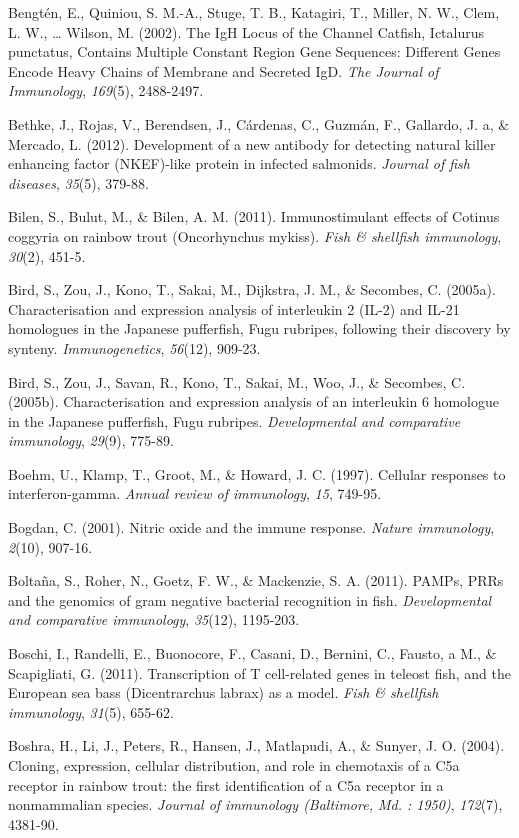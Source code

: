 \documentclass[12pt,letterpaper,oneside]{scrbook}
\begin{document}
Bengtén, E., Quiniou, S. M.-A., Stuge, T. B., Katagiri, T., Miller, N.
W., Clem, L. W., \ldots{} Wilson, M. (2002). The IgH Locus of the
Channel Catfish, Ictalurus punctatus, Contains Multiple Constant Region
Gene Sequences: Different Genes Encode Heavy Chains of Membrane and
Secreted IgD. \emph{The Journal of Immunology}, \emph{169}(5),
2488-2497.

Bethke, J., Rojas, V., Berendsen, J., Cárdenas, C., Guzmán, F.,
Gallardo, J. a, \& Mercado, L. (2012). Development of a new antibody for
detecting natural killer enhancing factor (NKEF)-like protein in
infected salmonids. \emph{Journal of fish diseases}, \emph{35}(5),
379-88.

Bilen, S., Bulut, M., \& Bilen, A. M. (2011). Immunostimulant effects of
Cotinus coggyria on rainbow trout (Oncorhynchus mykiss). \emph{Fish \&
shellfish immunology}, \emph{30}(2), 451-5.

Bird, S., Zou, J., Kono, T., Sakai, M., Dijkstra, J. M., \& Secombes, C.
(2005a). Characterisation and expression analysis of interleukin 2
(IL-2) and IL-21 homologues in the Japanese pufferfish, Fugu rubripes,
following their discovery by synteny. \emph{Immunogenetics},
\emph{56}(12), 909-23.

Bird, S., Zou, J., Savan, R., Kono, T., Sakai, M., Woo, J., \& Secombes,
C. (2005b). Characterisation and expression analysis of an interleukin 6
homologue in the Japanese pufferfish, Fugu rubripes. \emph{Developmental
and comparative immunology}, \emph{29}(9), 775-89.

Boehm, U., Klamp, T., Groot, M., \& Howard, J. C. (1997). Cellular
responses to interferon-gamma. \emph{Annual review of immunology},
\emph{15}, 749-95.

Bogdan, C. (2001). Nitric oxide and the immune response. \emph{Nature
immunology}, \emph{2}(10), 907-16.

Boltaña, S., Roher, N., Goetz, F. W., \& Mackenzie, S. A. (2011). PAMPs,
PRRs and the genomics of gram negative bacterial recognition in fish.
\emph{Developmental and comparative immunology}, \emph{35}(12),
1195-203.

Boschi, I., Randelli, E., Buonocore, F., Casani, D., Bernini, C.,
Fausto, a M., \& Scapigliati, G. (2011). Transcription of T cell-related
genes in teleost fish, and the European sea bass (Dicentrarchus labrax)
as a model. \emph{Fish \& shellfish immunology}, \emph{31}(5), 655-62.

Boshra, H., Li, J., Peters, R., Hansen, J., Matlapudi, A., \& Sunyer, J.
O. (2004). Cloning, expression, cellular distribution, and role in
chemotaxis of a C5a receptor in rainbow trout: the first identification
of a C5a receptor in a nonmammalian species. \emph{Journal of immunology
(Baltimore, Md. : 1950)}, \emph{172}(7), 4381-90.
\end{document}
